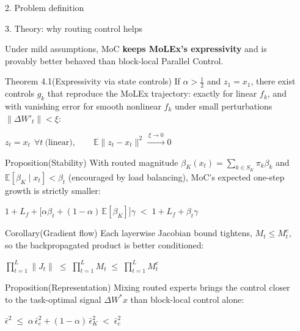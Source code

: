 \documentclass[final]{beamer}
\newlength{\sepwidth}
\newlength{\colwidth}
\newcommand{\separatorcolumn}{\begin{column}{\sepwidth}\end{column}}
\newcommand{\eqline}[1]{\par{\centering$\displaystyle #1$\par}}
\begin{document}
\begin{frame}[t]
\begin{columns}[t]
\begin{column}{\colwidth}
\begin{block}{2. Problem definition}
  \end{block}

  \begin{block}{3. Theory: why routing control helps}

    Under mild assumptions, MoC \textbf{keeps MoLEx's expressivity} and is
    provably better behaved than block-local Parallel Control.

    \begin{thmbox}{Theorem 4.1}{(Expressivity via state controls)}
      If $\alpha>\tfrac12$ and $z_1=x_1$, there exist controls $g_k$ that
      reproduce the MoLEx trajectory: exactly for linear $f_k$, and with
      vanishing error for smooth nonlinear $f_k$ under small perturbations
      $\|\Delta W'_t\|<\xi$:
      \eqline{z_t=x_t\ \ \forall t\ \text{(linear)},\qquad
        \mathbb{E}\|z_t-x_t\|^2\xrightarrow{\ \xi\to0\ }0}
    \end{thmbox}

    \begin{thmbox}{Proposition}{(Stability)}
      With routed magnitude $\beta_K(x_t)=\sum_{k\in S_K}\pi_k\beta_k$ and
      $\mathbb{E}[\beta_K\mid x_t]<\beta_t$ (encouraged by load balancing),
      MoC's expected one-step growth is strictly smaller:
      \eqline{1+L_f+\big[\alpha\beta_t+(1-\alpha)\,\mathbb{E}[\beta_K]\big]\gamma
        \;<\;1+L_f+\beta_t\gamma}
    \end{thmbox}

    \begin{thmbox}{Corollary}{(Gradient flow)}
      Each layerwise Jacobian bound tightens, $M_t\le M_t^{c}$, so the
      backpropagated product is better conditioned:
      \eqline{\prod_{t=1}^{L}\|J_t\|\;\le\;\prod_{t=1}^{L}M_t\;\le\;\prod_{t=1}^{L}M_t^{c}}
    \end{thmbox}

    \begin{thmbox}{Proposition}{(Representation)}
      Mixing routed experts brings the control closer to the task-optimal
      signal $\Delta W^{*}x$ than block-local control alone:
      \eqline{\bar\epsilon^{2}\;\le\;\alpha\,\bar\epsilon_c^{2}+(1-\alpha)\,\bar\epsilon_K^{2}\;<\;\bar\epsilon_c^{2}}
    \end{thmbox}

  \end{block}

\end{column}

\separatorcolumn



\end{columns}
\end{frame}
\end{document}
